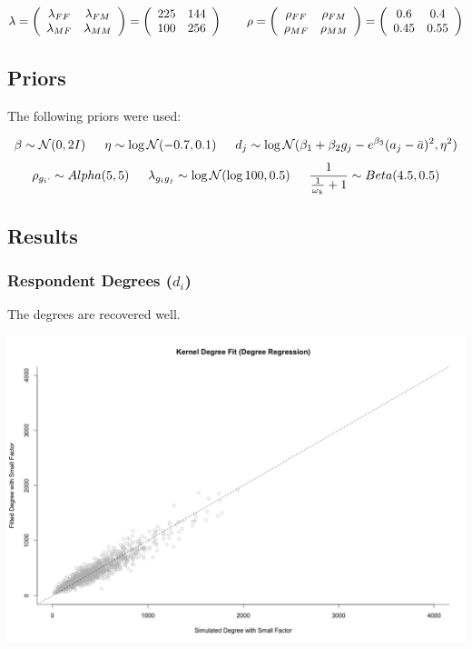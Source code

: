 \documentclass[12pt]{article}
\begin{document}
$$ \lambda
= \left( \begin{array}{cc} \lambda_{FF} & \lambda_{FM} \\
\lambda_{MF} & \lambda_{MM} \end{array} \right) 
= \left( \begin{array}{cc}
225 & 144 \\
100 & 256 \end{array} \right)
\hspace{20 pt}
\rho
= \left( \begin{array}{cc} \rho_{FF} & \rho_{FM} \\
\rho_{MF} & \rho_{MM} \end{array} \right) 
= \left( \begin{array}{cc}
0.6 & 0.4 \\
0.45 & 0.55 \end{array} \right) $$ \vspace{7 pt}

\subsection{Priors}
\noindent The following priors were used:

$$
\beta \sim \mathcal{N}(0, 2I)
\hspace{15 pt}
\eta \sim \log\mathcal{N}(-0.7, 0.1)
\hspace{15 pt}
d_j \sim \log\mathcal{N}(\beta_1 + \beta_2 g_j - e^{\beta_3} (a_j - \bar{a})^2, \eta^2)
$$
$$
\rho_{g_i\cdot} \sim Alpha(5,5)
\hspace{15 pt}
\lambda_{g_ig_j} \sim \log\mathcal{N}(\log 100, 0.5)
\hspace{15 pt}
\frac{1}{ \frac{1}{\omega_k}+1} \sim Beta(4.5,0.5)
$$

\pagebreak
\subsection{Results}
\subsubsection*{Respondent Degrees ($d_i$)}
\noindent The degrees are recovered well.

\begin{center}
\includegraphics[scale = 0.34]{fig/fit_deg_reg.png}
\end{center}
\end{document}
